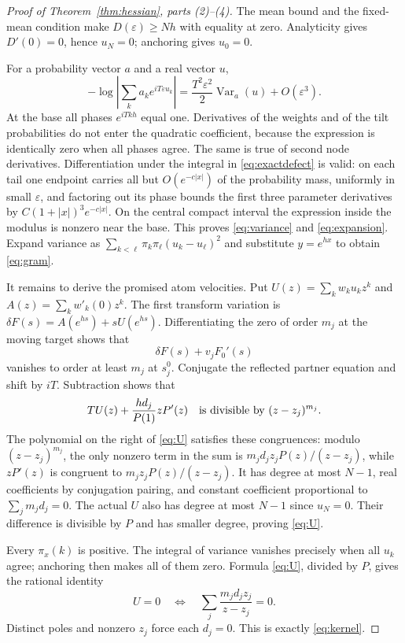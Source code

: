 \documentclass[11pt]{article}
\theoremstyle{remark}\newtheorem{remark}[theorem]{Remark}
\DeclareMathOperator{\Var}{Var}
\begin{document}
\begin{proof}[Proof of Theorem~\ref{thm:hessian}, parts (2)--(4)]
The mean bound and the fixed-mean condition make $D(\varepsilon)\ge Nh$ with equality at zero. Analyticity gives $D'(0)=0$, hence $u_N=0$; anchoring gives $u_0=0$.

For a probability vector $a$ and a real vector $u$,
\[
 -\log\left|\sum_ka_ke^{iT\varepsilon u_k}\right|
 =\frac{T^2\varepsilon^2}{2}\Var_a(u)+O(\varepsilon^3).
\]
At the base all phases $e^{iTkh}$ equal one. Derivatives of the weights and of the tilt probabilities do not enter the quadratic coefficient, because the expression is identically zero when all phases agree. The same is true of second node derivatives. Differentiation under the integral in \eqref{eq:exactdefect} is valid: on each tail one endpoint carries all but $O(e^{-c|x|})$ of the probability mass, uniformly in small $\varepsilon$, and factoring out its phase bounds the first three parameter derivatives by $C(1+|x|)^3e^{-c|x|}$. On the central compact interval the expression inside the modulus is nonzero near the base. This proves \eqref{eq:variance} and \eqref{eq:expansion}. Expand variance as $\sum_{k<\ell}\pi_k\pi_\ell(u_k-u_\ell)^2$ and substitute $y=e^{hx}$ to obtain \eqref{eq:gram}.

It remains to derive the promised atom velocities. Put $U(z)=\sum_kw_ku_kz^k$ and $A(z)=\sum_kw'_k(0)z^k$. The first transform variation is $\delta F(s)=A(e^{hs})+sU(e^{hs})$. Differentiating the zero of order $m_j$ at the moving target shows that
\[
 \delta F(s)+v_jF_0'(s)
\]
vanishes to order at least $m_j$ at $s_j^0$. Conjugate the reflected partner equation and shift by $iT$. Subtraction shows that
\[
 T U(z)+\frac{h d_j}{P(1)}zP'(z)
 \quad\hbox{is divisible by }(z-z_j)^{m_j}.
\]
The polynomial on the right of \eqref{eq:U} satisfies these congruences: modulo $(z-z_j)^{m_j}$, the only nonzero term in the sum is $m_jd_jz_jP(z)/(z-z_j)$, while $zP'(z)$ is congruent to $m_jz_jP(z)/(z-z_j)$. It has degree at most $N-1$, real coefficients by conjugation pairing, and constant coefficient proportional to $\sum_jm_jd_j=0$. The actual $U$ also has degree at most $N-1$ since $u_N=0$. Their difference is divisible by $P$ and has smaller degree, proving \eqref{eq:U}.

Every $\pi_x(k)$ is positive. The integral of variance vanishes precisely when all $u_k$ agree; anchoring then makes all of them zero. Formula \eqref{eq:U}, divided by $P$, gives the rational identity
\[
 U=0\quad\Longleftrightarrow\quad
 \sum_j\frac{m_jd_jz_j}{z-z_j}=0.
\]
Distinct poles and nonzero $z_j$ force each $d_j=0$. This is exactly \eqref{eq:kernel}.
\end{proof}
\end{document}
